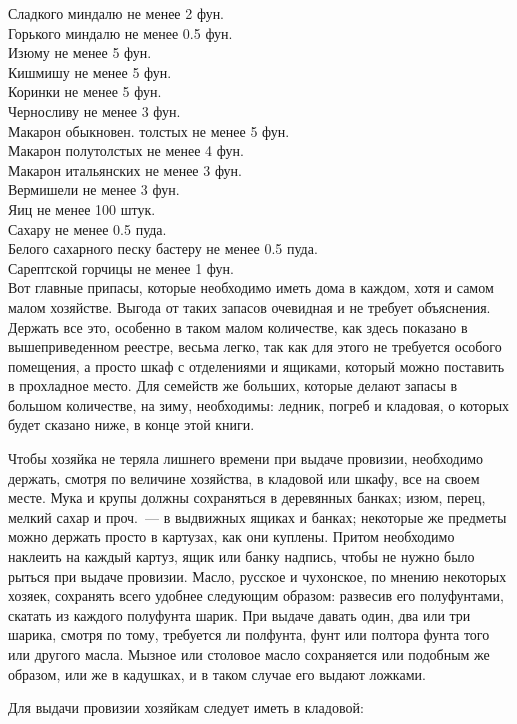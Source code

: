 Сладкого миндалю не менее 2 фун.\\
Горького миндалю не менее 0.5 фун.\\
Изюму не менее 5 фун.\\
Кишмишу не менее 5 фун.\\
Коринки не менее 5 фун.\\
Черносливу не менее 3 фун.\\
Макарон обыкновен. толстых не менее 5 фун.\\
Макарон полутолстых не менее 4 фун.\\
Макарон итальянских не менее 3 фун.\\
Вермишели не менее 3 фун.\\
Яиц не менее 100 штук.\\
Сахару не менее 0.5 пуда.\\
Белого сахарного песку бастеру не менее 0.5 пуда.\\
Сарептской горчицы не менее 1 фун.\\

Вот главные припасы, которые необходимо иметь дома в каждом, хотя и самом малом хозяйстве. Выгода от таких запасов очевидная и не требует объяснения. Держать все это, особенно в таком малом количестве, как здесь показано в вышеприведенном реестре, весьма легко, так как для этого не требуется особого помещения, а просто шкаф с отделениями и ящиками, который можно поставить в прохладное место. Для семейств же больших, которые делают запасы в большом количестве, на зиму, необходимы: ледник, погреб и кладовая, о которых будет сказано ниже, в конце этой книги.

Чтобы хозяйка не теряла лишнего времени при выдаче провизии, необходимо держать, смотря по величине хозяйства, в кладовой или шкафу, все на своем месте. Мука и крупы должны сохраняться в деревянных банках; изюм, перец, мелкий сахар и проч.~--- в выдвижных ящиках и банках; некоторые же предметы можно держать просто в картузах, как они куплены. Притом необходимо наклеить на каждый картуз, ящик или банку надпись, чтобы не нужно было рыться при выдаче провизии. Масло, русское и чухонское, по мнению некоторых хозяек, сохранять всего удобнее следующим образом: развесив его полуфунтами, скатать из каждого полуфунта шарик. При выдаче давать один, два или три шарика, смотря по тому, требуется ли полфунта, фунт или полтора фунта того или другого масла. Мызное или столовое масло сохраняется или подобным же образом, или же в кадушках, и в таком случае его выдают ложками.

Для выдачи провизии хозяйкам следует иметь в кладовой:

